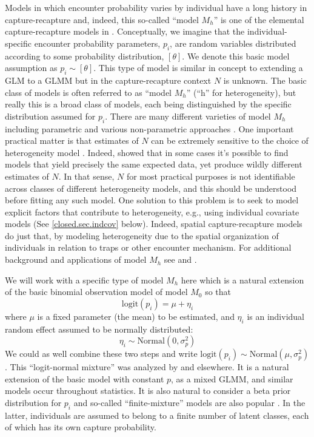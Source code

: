 Models in which encounter probability varies by individual have a long
history in capture-recapture and, indeed, this so-called ``model
$M_h$'' is one of the elemental capture-recapture models in
\citep{otis_etal:1978}. Conceptually, we imagine that the
individual-specific encounter probability parameters, $p_{i}$, are
random variables distributed according to some probability
distribution, $[\theta]$. We denote this basic model assumption as
$p_{i} \sim [\theta]$. This type of model is similar in concept to
extending a GLM to a GLMM but in the capture-recapture context $N$ is
unknown.  The basic class of models is often referred to as ``model
$M_h$'' (``h'' for heterogeneity), but really this is a broad class of
models, each being distinguished by the specific distribution assumed
for $p_{i}$.  There are many different varieties of model $M_{h}$
including parametric and various non-parametric approaches
\citep{burnham_overton:1978, norris_pollock:1996, pledger:2000}. One
important practical matter is that estimates of $N$ can be extremely
sensitive to the choice of heterogeneity model
\citep{fienberg_etal:1999, dorazio_royle:2003, link:2003}. Indeed,
\citet{link:2003} showed that in some cases it's possible to find
models that yield precisely the same expected data, yet produce wildly
different estimates of $N$. In that sense, $N$ for most practical
purposes is not identifiable across classes of different heterogeneity
models, and this should be understood before fitting any such
model. One solution to this problem is to seek to model explicit
factors that contribute to heterogeneity, e.g., using individual
covariate models (See \ref{closed.sec.indcov} below). Indeed, spatial
capture-recapture models  do just that, by modeling
heterogeneity due to the spatial organization of individuals in
relation to traps or other encounter mechanism.  For additional
background and applications of model $M_{h}$ see
\citet[][Chapt. 6]{royle_dorazio:2008} and
\citet[][Chapt. 6]{kery_schaub:2011}.

We will work with a specific type of model $M_{h}$ here which is a
natural extension of
the basic binomial observation model of model $M_{0}$ so
that
\[
\mbox{logit}(p_{i}) = \mu + \eta_{i}
\]
where $\mu$ is a fixed parameter (the mean) to be estimated, and
$\eta_{i}$ is an individual random effect assumed to be normally distributed:
\[
\eta_{i} \sim \mbox{Normal}(0, \sigma_{p}^2)
\]
We could as well combine these two steps and write $\mbox{logit}(p_{i}) \sim \mbox{Normal}(\mu,\sigma_{p}^2)$.
This ``logit-normal mixture'' was analyzed by
\citet{coull_agresti:1999} and elsewhere. It is a natural extension of
the basic model with constant $p$, as a mixed GLMM, and similar models
occur throughout statistics. It is also natural to consider a beta
prior distribution for $p_{i}$ \citep{dorazio_royle:2003} and
so-called ``finite-mixture'' models are also popular
\citep{norris_pollock:1996, pledger:2000}. In the latter, individuals
are assumed to belong to a finite number of latent classes, each of
which has its own capture probability.


